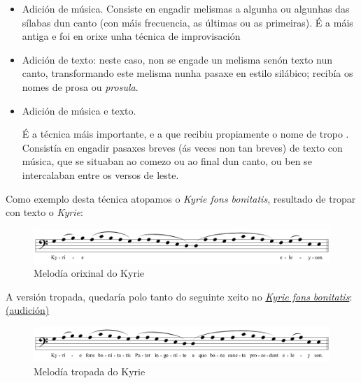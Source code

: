 \documentclass[spanish, a4paper,nobind]{templates/ociamthesis}
\begin{document}
\begin{itemize}
\item
  Adición de música. Consiste en engadir melismas a algunha ou algunhas das sílabas dun canto (con máis frecuencia, as últimas ou as primeiras). É a máis antiga e foi en orixe unha técnica de improvisación
\item
  Adición de texto: neste caso, non se engade un melisma senón texto nun canto, transformando este melisma nunha pasaxe en estilo silábico; recibía os nomes de prosa ou \emph{prosula}.
\item
  Adición de música e texto.

  É a técnica máis importante, e a que recibiu propiamente o nome de tropo . Consistía en engadir pasaxes breves (ás veces non tan breves) de texto con música, que se situaban ao comezo ou ao final dun canto, ou ben se intercalaban entre os versos de leste.
\end{itemize}

Como exemplo desta técnica atopamos o \emph{Kyrie fons bonitatis}, resultado de tropar con texto o \emph{Kyrie}:

\begin{figure}[ht]

{\centering \includegraphics[width=1\linewidth]{figures/ud-03/Kyrie-1} 

}

\caption[Melodía do *Kyrie*]{Melodía orixinal do Kyrie}\label{fig:kyrie-1}
\end{figure}

A versión tropada, quedaría polo tanto do seguinte xeito no \href{https://es.wikipedia.org/wiki/Kyrie_eleison}{\emph{Kyrie fons bonitatis}}: \href{https://open.spotify.com/track/74ztOxzqhvEStzW4pqZII0?si=fbe1ed03f9bf4d6c}{(audición)}

\begin{figure}[ht]

{\centering \includegraphics[width=1\linewidth]{figures/ud-03/Kyrie-fons-bonitatis} 

}

\caption[Melodía tropada do Kyrie fons bonitatis]{Melodía tropada do Kyrie}\label{fig:kyrie-fons-bonitatis}
\end{figure}
\end{document}
